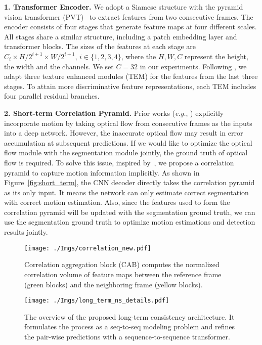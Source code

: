 \documentclass[10pt,twocolumn,letterpaper]{article}
\def\eg{\emph{e.g.}}
\begin{document}
\noindent\textbf{1. Transformer Encoder.}
We adopt a Siamese structure with the pyramid vision transformer (PVT)~\cite{wang2021pvtv2} to extract features from two consecutive frames. 
The encoder consists of four stages that generate feature maps at four different scales. All stages share a similar structure, including a patch embedding layer and transformer blocks. The sizes of the features at each stage are $ C_i \times H / 2^{i+1} \times W/2^{i+1} $, $i \in \{1, 2, 3, 4\}$, where the $H,W,C$ represent the height, the width and the channels. We set $C=32$ in our experiments. Following \cite{fan2021concealed}, we adapt three texture enhanced modules (TEM) for the features from the last three stages. To attain more discriminative feature representations, each TEM includes four parallel residual branches. 

\noindent\textbf{2. Short-term Correlation Pyramid.}
Prior works (\eg, \cite{tokmakov2017learning, yang2021selfsupervised}) explicitly incorporate motion by taking optical flow from consecutive frames as the inputs into a deep network. However, the inaccurate optical flow may result in error accumulation at subsequent predictions. If we would like to optimize the optical flow module with the segmentation module jointly, the ground truth of optical flow is required. To solve this issue, inspired by~\cite{li2021arvo}, we propose a correlation pyramid to capture motion information implicitly. As shown in Figure~\ref{fig:short_term}, the CNN decoder directly takes the correlation pyramid as its only input. It means the network can only estimate correct segmentation with correct motion estimation. Also, since the features used to form the correlation pyramid will be updated with the segmentation ground truth, we can use the segmentation ground truth to optimize motion estimations and detection results jointly.

\begin{figure}[b!]
\vspace{-10pt}
\begin{center}
\texttt{[image: ./Imgs/correlation\_new.pdf]}
\end{center}
\vspace{-20pt}
\caption{Correlation aggregation block (CAB) computes the normalized correlation volume of feature maps between the reference frame (green blocks) and the neighboring frame (yellow blocks).}
\label{fig:all_range}
\end{figure}


\begin{figure*}[t!]
\begin{center}
\texttt{[image: ./Imgs/long\_term\_ns\_details.pdf]}
\end{center}
\vspace{-20pt}
\caption{The overview of the proposed long-term consistency architecture. It formulates the process as a seq-to-seq modeling problem and refines the pair-wise predictions with a sequence-to-sequence transformer.}
\vspace{-2mm}
\label{fig:long_term}
\end{figure*}
\end{document}
